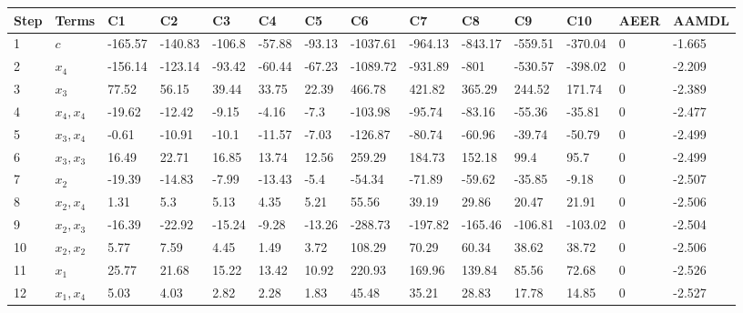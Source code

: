 \begin{tabular}{llllllllllllll}
Step & Terms & C1 & C2 & C3 & C4 & C5 & C6 & C7 & C8 & C9 & C10 & AEER & AAMDL \\ 
\hline 
1 & $c$ & -165.57 & -140.83 & -106.8 & -57.88 & -93.13 & -1037.61 & -964.13 & -843.17 & -559.51 & -370.04 & 0 & -1.665 \\ 
2 & $x_4$ & -156.14 & -123.14 & -93.42 & -60.44 & -67.23 & -1089.72 & -931.89 & -801 & -530.57 & -398.02 & 0 & -2.209 \\ 
3 & $x_3$ & 77.52 & 56.15 & 39.44 & 33.75 & 22.39 & 466.78 & 421.82 & 365.29 & 244.52 & 171.74 & 0 & -2.389 \\ 
4 & $x_4,x_4$ & -19.62 & -12.42 & -9.15 & -4.16 & -7.3 & -103.98 & -95.74 & -83.16 & -55.36 & -35.81 & 0 & -2.477 \\ 
5 & $x_3,x_4$ & -0.61 & -10.91 & -10.1 & -11.57 & -7.03 & -126.87 & -80.74 & -60.96 & -39.74 & -50.79 & 0 & -2.499 \\ 
6 & $x_3,x_3$ & 16.49 & 22.71 & 16.85 & 13.74 & 12.56 & 259.29 & 184.73 & 152.18 & 99.4 & 95.7 & 0 & -2.499 \\ 
7 & $x_2$ & -19.39 & -14.83 & -7.99 & -13.43 & -5.4 & -54.34 & -71.89 & -59.62 & -35.85 & -9.18 & 0 & -2.507 \\ 
8 & $x_2,x_4$ & 1.31 & 5.3 & 5.13 & 4.35 & 5.21 & 55.56 & 39.19 & 29.86 & 20.47 & 21.91 & 0 & -2.506 \\ 
9 & $x_2,x_3$ & -16.39 & -22.92 & -15.24 & -9.28 & -13.26 & -288.73 & -197.82 & -165.46 & -106.81 & -103.02 & 0 & -2.504 \\ 
10 & $x_2,x_2$ & 5.77 & 7.59 & 4.45 & 1.49 & 3.72 & 108.29 & 70.29 & 60.34 & 38.62 & 38.72 & 0 & -2.506 \\ 
11 & $x_1$ & 25.77 & 21.68 & 15.22 & 13.42 & 10.92 & 220.93 & 169.96 & 139.84 & 85.56 & 72.68 & 0 & -2.526 \\ 
12 & $x_1,x_4$ & 5.03 & 4.03 & 2.82 & 2.28 & 1.83 & 45.48 & 35.21 & 28.83 & 17.78 & 14.85 & 0 & -2.527 \\ 
\hline 
\end{tabular}
